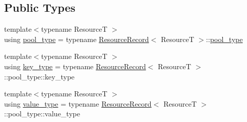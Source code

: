 \subsection*{Public Types}
\begin{DoxyCompactItemize}
\item 
{\footnotesize template$<$typename ResourceT $>$ }\\using \hyperlink{classmage_1_1_resource_manager_a4416f0a710790d8aa2d0bc006764695a}{pool\+\_\+type} = typename \hyperlink{structmage_1_1_resource_manager_1_1_resource_record}{Resource\+Record}$<$ ResourceT $>$\+::\hyperlink{classmage_1_1_resource_manager_a4416f0a710790d8aa2d0bc006764695a}{pool\+\_\+type}
\item 
{\footnotesize template$<$typename ResourceT $>$ }\\using \hyperlink{classmage_1_1_resource_manager_a5109dfe000a336d9fd2d467ba3dda5a1}{key\+\_\+type} = typename \hyperlink{structmage_1_1_resource_manager_1_1_resource_record}{Resource\+Record}$<$ ResourceT $>$\+::pool\+\_\+type\+::key\+\_\+type
\item 
{\footnotesize template$<$typename ResourceT $>$ }\\using \hyperlink{classmage_1_1_resource_manager_aaa3a9fe40c809cd51eda14d2322746ac}{value\+\_\+type} = typename \hyperlink{structmage_1_1_resource_manager_1_1_resource_record}{Resource\+Record}$<$ ResourceT $>$\+::pool\+\_\+type\+::value\+\_\+type
\end{DoxyCompactItemize}
